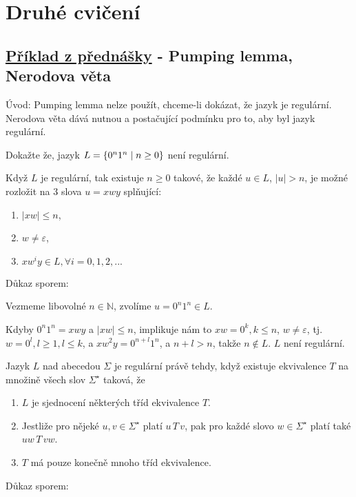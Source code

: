 \section{Druhé cvičení}

\subsection{\href{https://youtu.be/agNAMdc8zYY?list=PLQL6z4JeTTQkLuzI78OTnfYBclE1g0UjS&t=778}{Příklad z přednášky} 
- Pumping lemma, Nerodova věta}
Úvod: Pumping lemma nelze použít, chceme-li dokázat, že jazyk je regulární. Nerodova věta dává nutnou a postačující 
podmínku pro to, aby byl jazyk regulární. 

Dokažte že, jazyk $L = \left\lbrace 0^n 1^n \mid n \geq 0 \right\rbrace$ není regulární.

Když $L$ je regulární, tak existuje $n \geq 0$ takové, že každé ${u \in L}$,
$|u| > n$, je možné rozložit na 3 slova $u = xwy$ splňující:

\begin{enumerate}[1), noitemsep]
    \item $|xw| \leq n$,
    \item $w \not= \varepsilon$,
    \item $xw^i y \in L, \forall i = 0, 1, 2, ...$
\end{enumerate}

Důkaz sporem: 

Vezmeme libovolné $n \in \mathbb{N}$, zvolíme $u = 0^n1^n \in L$.

Kdyby $0^n1^n = xwy$ a $|xw| \leq n$, implikuje nám to $xw=0^k, k \leq n$, $w \neq \varepsilon$, tj.
$w = 0^l, l \geq 1, l \leq k$, a $xw^2y = 0^{n+l} 1^n$, a $n+l > n$, takže $n \notin L$.
$L$ není regulární.

 Jazyk $L$ nad abecedou $\Sigma$ je regulární právě tehdy, když existuje ekvivalence $T$ na množině 
všech slov $\Sigma^{\star}$ taková, že 
\begin{enumerate}[1), noitemsep]
    \item $L$ je sjednocení některých tříd ekvivalence $T$. 
    \item Jestliže pro nějeké $u, v \in \Sigma^{\star}$ platí $u \, T \, v$, pak pro každé slovo 
    $w \in \Sigma^{\star}$ platí také $uw\, T\, vw$. 
    \item $T$ má pouze konečně mnoho tříd ekvivalence. 
\end{enumerate}

Důkaz sporem: 

